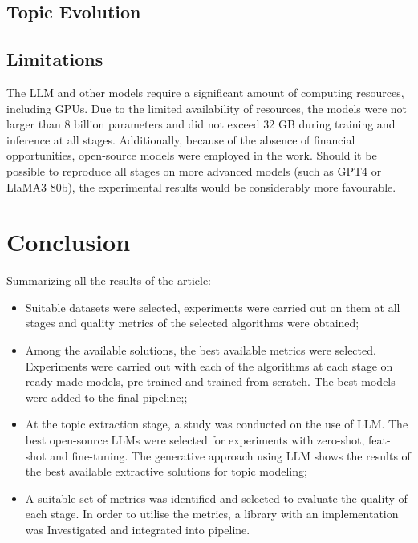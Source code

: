 \documentclass[PMI,VKR]{HSEUniversity}
\begin{document}
\section{Topic Evolution}


\section{Limitations}

The LLM and other models require a significant amount of computing resources, including GPUs. Due to the limited availability of resources, the models were not larger than 8 billion parameters and did not exceed 32 GB during training and inference at all stages. 
Additionally, because of the absence of financial opportunities, open-source models were employed in the work. Should it be possible to reproduce all stages on more advanced models (such as GPT4 or LlaMA3 80b), the experimental results would be considerably more favourable.

\chapter*{Conclusion}

Summarizing all the results of the article:
\begin{itemize}
    \item Suitable datasets were selected, experiments were carried out on them at all stages and quality metrics of the selected algorithms were obtained;
    \item Among the available solutions, the best available metrics were selected. Experiments were carried out with each of the algorithms at each stage on ready-made models, pre-trained and trained from scratch. The best models were added to the final pipeline;;
    \item At the topic extraction stage, a study was conducted on the use of LLM. The best open-source LLMs were selected for experiments with zero-shot, feat-shot and fine-tuning. The generative approach using LLM shows the results of the best available extractive solutions for topic modeling;
    \item A suitable set of metrics was identified and selected to evaluate the quality of each stage. In order to utilise the metrics, a library with an implementation was Investigated and integrated into pipeline.
\end{itemize}

\putbibliography
\end{document}
